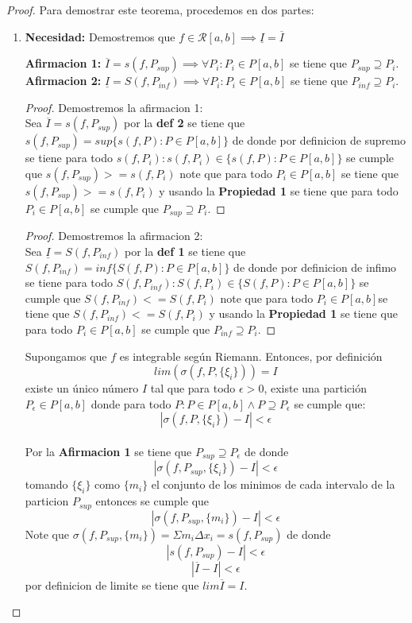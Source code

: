 \documentclass{article}
\begin{document}
\begin{proof}
Para demostrar este teorema, procedemos en dos partes:
\begin{enumerate}
    \item \textbf{Necesidad:} 
Demostremos que  \(f \in \mathcal{R}[a, b] \implies \underline{I} = \overline{I} \)

    \textbf{Afirmacion 1:} \(\overline{I} = s(f, P_{sup}) \implies \forall  P_i: P_i \in P[a,b]\) se tiene que \(P_{sup} \supseteq P_i\).\\
    \textbf{Afirmacion 2:} \(\underline{I} = S(f, P_{inf}) \implies \forall  P_i: P_i \in P[a,b]\) se tiene que \(P_{inf} \supseteq P_i\).
\begin{proof}
Demostremos la afirmacion 1:\\
Sea \(\overline{I} = s(f, P_{sup})\) por la \textbf{def 2} se tiene que \(s(f, P_{sup}) = sup\{ s(f, P): P \in P[a, b] \}\) de donde por definicion de supremo se tiene para todo \(  s(f, P_i): s(f, P_i) \in \{ s(f, P): P \in P[a, b] \}\)  se cumple que \(s(f, P_{sup}) >= s(f, P_i)\) note que para todo \(P_i \in P[a,b]\) se tiene que \(s(f, P_{sup}) >= s(f, P_i)\) y usando la \textbf{Propiedad 1} se tiene que para todo \(P_i \in P[a,b]\) se cumple que \( P_{sup} \supseteq P_i\).
\end{proof}

\begin{proof}
Demostremos la afirmacion 2:\\
Sea \(\underline{I} = S(f, P_{inf})\) por la \textbf{def 1} se tiene que \(S(f, P_{inf}) = inf\{ S(f, P): P \in P[a, b] \}\) de donde por definicion de infimo se tiene para todo \(  S(f, P_{inf}): S(f, P_i) \in \{ S(f, P): P \in P[a, b] \}\)  se cumple que \(S(f, P_{inf}) <= S(f, P_i)\) note que para todo \(P_i \in P[a,b]\)se tiene que \(S(f, P_{inf}) <= S(f, P_i)\) y usando la \textbf{Propiedad 1} se tiene que para todo \(P_i \in P[a,b]\) se cumple que \( P_{inf} \supseteq P_i\).
\end{proof}

 Supongamos que \( f \) es integrable según Riemann. Entonces, por definición
\[
lim(\sigma(f, P,\{\xi_i\})) = I
\]
existe un único número \( I \) tal que para todo \( \epsilon > 0 \), existe una partición \( P_\epsilon \in P[a, b]\)  donde para todo \( P: P \in P[a, b] \wedge P \supseteq P_\epsilon\) se cumple que:
    \[
    |\sigma(f, P,\{\xi_i\}) - I| < \epsilon
    \]\\
Por la \textbf{Afirmacion 1} se tiene que \(P_{sup} \supseteq P_\epsilon\) de donde 
\[
|\sigma(f, P_{sup},\{\xi_i\}) - I| < \epsilon
\]
tomando \(\{\xi_i\}\) como \(\{m_i\}\) el conjunto de los minimos de cada intervalo de la particion \(P_{sup}\) entonces se cumple que
\[
|\sigma(f, P_{sup},\{m_i\}) - I| < \epsilon
\]
Note que \(\sigma(f, P_{sup},\{m_i\}) = \Sigma m_i\Delta x_i = s(f, P_{sup})\) de donde
\[
|s(f, P_{sup}) - I| < \epsilon
\]
\[
|\overline{I} - I| < \epsilon
\]
por definicion de limite se tiene que \(lim\overline{I} = I\).\\


\end{enumerate}
\end{proof}
\end{document}
